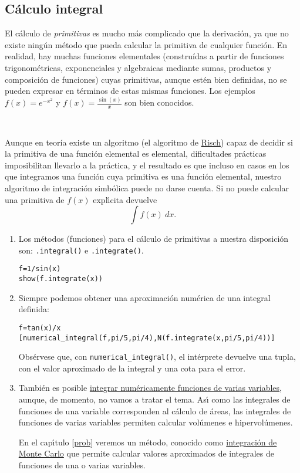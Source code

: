 \subsection{C\'alculo integral}
El cálculo de {\itshape primitivas}  es mucho  más complicado 
que la derivación, ya que no existe ningún método que pueda calcular
la primitiva de cualquier función. En realidad, hay muchas funciones elementales
(construídas
a partir
de funciones trigonométricas, exponenciales y algebraicas mediante sumas,
productos y
composición de funciones) cuyas primitivas, aunque estén bien definidas, no se
pueden
expresar en términos de estas mismas funciones. Los ejemplos $f(x)=e^{-x^2}$ y
$f(x)=\frac{\sin(x)}{x}$ son bien conocidos.

\

Aunque en teoría existe un algoritmo (el algoritmo de
\href{http://en.wikipedia.org/wiki/Risch\_algorithm}{Risch}) capaz de decidir si
la
primitiva de una función elemental es elemental, dificultades
prácticas
imposibilitan llevarlo a la práctica, y el resultado es que incluso en casos en
los que
integramos una función cuya primitiva es una función elemental, nuestro
algoritmo
de integración simbólica puede no darse cuenta. Si {\sage} no puede calcular una
primitiva de $f(x)$
expl\'{\i}cita devuelve  
\[\int f(x)\ dx.\]

\begin{enumerate}
 \item Los métodos (funciones) para el cálculo de primitivas a nuestra
disposición son:
%
\lstinline|.integral()| e \lstinline|.integrate()|.
\begin{lstlisting}[numbers=none]
f=1/sin(x)
show(f.integrate(x))
\end{lstlisting}
 \item Siempre podemos obtener una aproximación
numérica de una integral definida: 
\begin{lstlisting}[numbers=none]
f=tan(x)/x
[numerical_integral(f,pi/5,pi/4),N(f.integrate(x,pi/5,pi/4))]
\end{lstlisting}

Obsérvese que, con \lstinline|numerical_integral()|, el intérprete devuelve una
tupla, con
el valor aproximado de la integral y una cota para el error.
 
 \item Tambi\'en es posible
\href{
http://docs.scipy.org/doc/scipy/reference/tutorial/integrate.html#general-multip
le-integration-dblquad-tplquad-nquad}{integrar num\'ericamente funciones de
varias variables}, aunque,  de momento,  no vamos a tratar el tema. As\'{\i}
como las integrales de funciones de una variable corresponden al c\'alculo de
\'areas, las integrales de funciones de varias variables permiten calcular
vol\'umenes e hipervol\'umenes. 
 
 
 En el cap\'{\i}tulo \ref{prob}
veremos un m\'etodo, conocido como \hyperref[int-mc]{integraci\'on de Monte
Carlo}
que permite calcular valores aproximados de integrales de funciones de una o
varias variables. 
 
 
 
 
 
 \end{enumerate}


